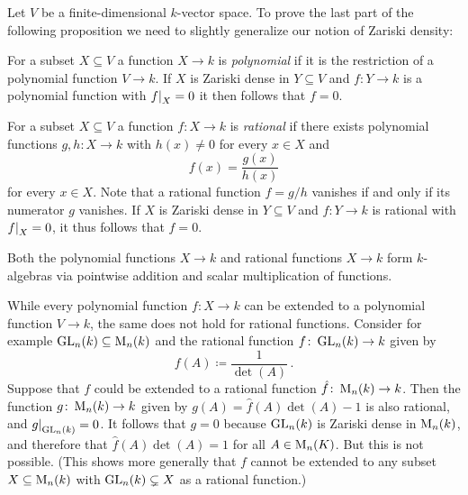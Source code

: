 \begin{fluff}
  Let $V$ be a finite-dimensional $k$-vector space.
  To prove the last part of the following proposition we need to slightly generalize our notion of Zariski density:
  
  For a subset $X \subseteq V$ a function $X \to k$ is \emph{polynomial} if it is the restriction of a polynomial function $V \to k$.
  If $X$ is Zariski dense in $Y \subseteq V$ and $f \colon Y \to k$ is a polynomial function with $\restrict{f}{X} = 0$ it then follows that $f = 0$.
  
  For a subset $X \subseteq V$ a function $f \colon X \to k$ is \emph{rational} if there exists polynomial functions $g, h \colon X \to k$ with $h(x) \neq 0$ for every $x \in X$ and
  \[
      f(x)
    = \frac{g(x)}{h(x)}
  \]
  for every $x \in X$.
  Note that a rational function $f = g/h$ vanishes if and only if its numerator $g$ vanishes.
  If $X$ is Zariski dense in $Y \subseteq V$ and $f \colon Y \to k$ is rational with $\restrict{f}{X} = 0$, it thus follows that $f = 0$.
  
  Both the polynomial functions $X \to k$ and rational functions $X \to k$ form $k$-algebras via pointwise addition and scalar multiplication of functions.
\end{fluff}


\begin{warning}
  While every polynomial function $f \colon X \to k$ can be extended to a polynomial function $V \to k$, the same does not hold for rational functions.
  Consider for example $\operatorname{GL}_n(k) \subseteq \operatorname{M}_n(k)$ and the rational function $f \colon \operatorname{GL}_n(k) \to k$ given by
  \[
              f(A)
    \coloneqq \frac{1}{\det(A)} \,.
  \]
  Suppose that $f$ could be extended to a rational function $\hat{f} \colon \operatorname{M}_n(k) \to k$.
  Then the function $g \colon \operatorname{M}_n(k) \to k$ given by $g(A) = \hat{f}(A) \det(A) - 1$ is also rational, and $\restrict{g}{\GL_n(k)} = 0$.
  It follows that $g = 0$ because $\operatorname{GL}_n(k)$ is Zariski dense in $\operatorname{M}_n(k)$, and therefore that $\hat{f}(A) \det(A) = 1$ for all $A \in \operatorname{M}_n(K)$.
  But this is not possible.
  (This shows more generally that $f$ cannot be extended to any subset $X \subseteq \operatorname{M}_n(k)$ with $\operatorname{GL}_n(k) \subsetneq X$ as a rational function.)
\end{warning}


